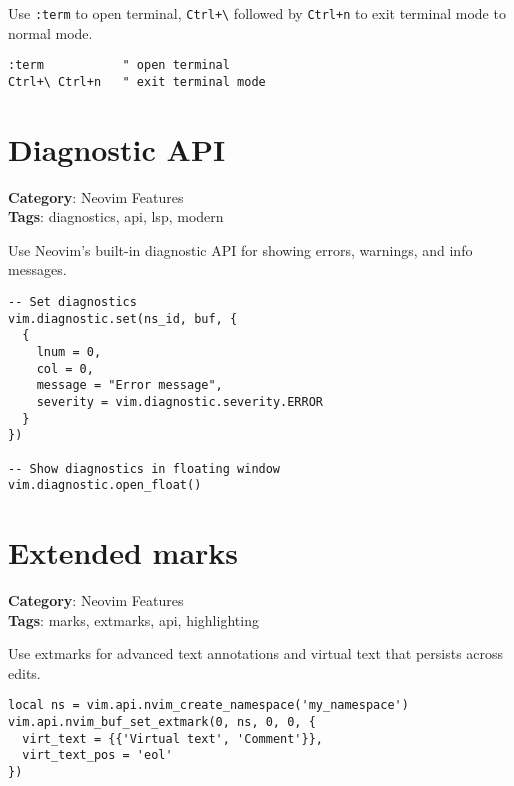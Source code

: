 {{{{{{{{{{Use {\footnotesize \Verb§:term§} to open terminal, {\footnotesize \Verb§Ctrl+\§} followed by {\footnotesize \Verb§Ctrl+n§} to exit terminal mode to normal mode.

\begin{Exa*}{}
\begin{Verbatim}[fontsize=\footnotesize, breaklines, breakanywhere]
:term           " open terminal
Ctrl+\ Ctrl+n   " exit terminal mode
\end{Verbatim}
\end{Exa*}

\section{Diagnostic API}

\textbf{Category}: Neovim Features\\ \textbf{Tags}: diagnostics, api, lsp, modern
\vspace{0.5cm}

Use Neovim's built-in diagnostic API for showing errors, warnings, and info messages.

\begin{Exa*}{}
\begin{Verbatim}[fontsize=\footnotesize, breaklines, breakanywhere]
-- Set diagnostics
vim.diagnostic.set(ns_id, buf, {
  {
    lnum = 0,
    col = 0,
    message = "Error message",
    severity = vim.diagnostic.severity.ERROR
  }
})

-- Show diagnostics in floating window
vim.diagnostic.open_float()
\end{Verbatim}
\end{Exa*}

\section{Extended marks}

\textbf{Category}: Neovim Features\\ \textbf{Tags}: marks, extmarks, api, highlighting
\vspace{0.5cm}

Use extmarks for advanced text annotations and virtual text that persists across edits.

\begin{Exa*}{}
\begin{Verbatim}[fontsize=\footnotesize, breaklines, breakanywhere]
local ns = vim.api.nvim_create_namespace('my_namespace')
vim.api.nvim_buf_set_extmark(0, ns, 0, 0, {
  virt_text = {{'Virtual text', 'Comment'}},
  virt_text_pos = 'eol'
})
\end{Verbatim}
\end{Exa*}

}}}}}}}}}}

